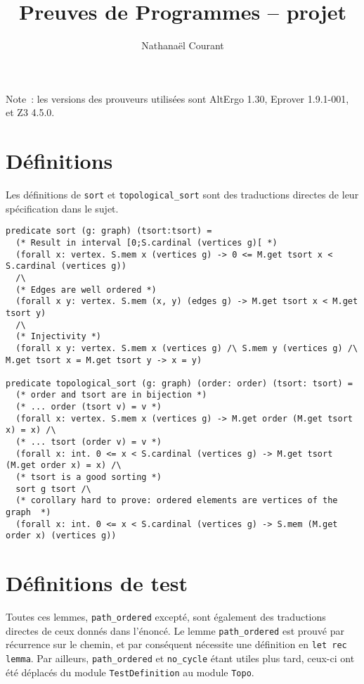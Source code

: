 \documentclass[a4paper,10pt]{article}
\title{Preuves de Programmes -- projet}
\author{Nathanaël Courant}
\begin{document}
\maketitle

Note~: les versions des prouveurs utilisées sont AltErgo 1.30, Eprover 1.9.1-001, et Z3 4.5.0.

\section{Définitions}

Les définitions de \lstinline{sort} et \lstinline{topological_sort} sont des traductions directes de leur spécification dans le sujet.

\begin{lstlisting}
predicate sort (g: graph) (tsort:tsort) =
  (* Result in interval [0;S.cardinal (vertices g)[ *)
  (forall x: vertex. S.mem x (vertices g) -> 0 <= M.get tsort x < S.cardinal (vertices g))
  /\
  (* Edges are well ordered *)
  (forall x y: vertex. S.mem (x, y) (edges g) -> M.get tsort x < M.get tsort y)
  /\
  (* Injectivity *)
  (forall x y: vertex. S.mem x (vertices g) /\ S.mem y (vertices g) /\ M.get tsort x = M.get tsort y -> x = y)

predicate topological_sort (g: graph) (order: order) (tsort: tsort) =
  (* order and tsort are in bijection *)
  (* ... order (tsort v) = v *)
  (forall x: vertex. S.mem x (vertices g) -> M.get order (M.get tsort x) = x) /\
  (* ... tsort (order v) = v *)
  (forall x: int. 0 <= x < S.cardinal (vertices g) -> M.get tsort (M.get order x) = x) /\
  (* tsort is a good sorting *)
  sort g tsort /\
  (* corollary hard to prove: ordered elements are vertices of the graph  *)
  (forall x: int. 0 <= x < S.cardinal (vertices g) -> S.mem (M.get order x) (vertices g))
\end{lstlisting}

\section{Définitions de test}

Toutes ces lemmes, \lstinline{path_ordered} excepté, sont également des traductions directes de ceux donnés dans l'énoncé. Le lemme \lstinline{path_ordered} est prouvé par récurrence sur le chemin, et par conséquent nécessite une définition en \lstinline{let rec lemma}. Par ailleurs, \lstinline{path_ordered} et \lstinline{no_cycle} étant utiles plus tard, ceux-ci ont été déplacés du module \lstinline{TestDefinition} au module \lstinline{Topo}.
\end{document}

